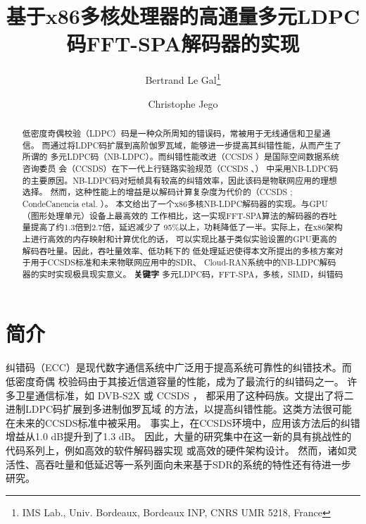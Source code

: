 \documentclass{cjc}
\begin{document}
\title{基于x86多核处理器的高通量多元LDPC码FFT-SPA解码器的实现}
\author{Bertrand Le Gal\footnote{IMS Lab., Univ. Bordeaux, Bordeaux INP, CNRS UMR 5218, France} \and Christophe Jego\footnotemark[1]}

\maketitle

\begin{abstract}
  低密度奇偶校验（LDPC）码是一种众所周知的错误码，常被用于无线通信和卫星通信。
  而通过将LDPC码扩展到高阶伽罗瓦域，能够进一步提高其纠错性能，从而产生了所谓的
  多元LDPC码（NB-LDPC）。而纠错性能改进（CCSDS \citeyear{CCSDS_2014}）是国际空间数据系统咨询委员
  会（CCSDS）在下一代上行链路实验规范（CCSDS \citeyear{CCSDS_2014}、\citeyear{CCSDS_2015}）
  中采用NB-LDPC码的主要原因。NB-LDPC码对短帧具有较高的纠错效率，因此该码是物联网应用的理想选择。
  然而，这种性能上的增益是以解码计算复杂度为代价的（CCSDS \citeyear{CCSDS_2014}; CondeCanencia etal. \citeyear{comparison_NBLDPC}）。
  本文给出了一个x86多核NB-LDPC解码器的实现。与GPU（图形处理单元）设备上最高效的
  工作相比，这一实现FFT-SPA算法的解码器的吞吐量提高了约1.3倍到2.7倍，延迟减少了
  95\%以上，功耗降低了一半。实际上，在x86架构上进行高效的内存映射和计算优化的话，
  可以实现比基于类似实验设置的GPU更高的解码吞吐量。因此，吞吐量效率、低功耗下的
  低处理延迟使得本文所提出的多核方案对于用于CCSDS标准和未来物联网应用中的SDR、
  Cloud-RAN系统中的NB-LDPC解码器的实时实现极具现实意义。\medskip\newline
  \textbf{关键字 }多元LDPC码，FFT-SPA，多核，SIMD，纠错码

\end{abstract}

\section{简介}

  纠错码（ECC）是现代数字通信系统中广泛用于提高系统可靠性的纠错技术。而低密度奇偶
  校验码\cite{gallager_low_1962}由于其接近信道容量的性能，成为了最流行的纠错码之一。
  许多卫星通信标准，如 DVB-S2X \cite{noauthor_dvb_nodate} 或 CCSDS \cite{CCSDS_2011}，
  都采用了这种码族。文\cite{davey_low_1998,noauthor_barnault_nodate}提出了将二进制LDPC码扩展到多进制伽罗瓦域
  的方法，以提高纠错性能。这类方法很可能在未来的CCSDS标准中被采用\cite{CCSDS_2015,dolecek_non-binary_2014}。
  事实上，在CCSDS环境中，应用该方法后的纠错增益从1.0 dB提升到了1.3 dB\cite{CCSDS_2015}。
  因此，大量的研究集中在这一新的具有挑战性的代码系列上，例如高效的软件解码器实现\cite{noauthor_wang_nodate,noauthor_andrade_nodate,noauthor_beermann_nodate,andrade_optimized_2014,noauthor_thi_nodate,beermann_gpu_2015,noauthor_pham_nodate,liu_high-throughput_2018}
  或高效的硬件架构设计\cite{boutillon_design_2013,abassi_novel_2017}。
  然而，诸如灵活性、高吞吐量和低延迟等一系列面向未来基于SDR的系统的特性还有待进一步研究。
\end{document}
